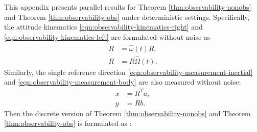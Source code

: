 This appendix presents parallel results for Theorem \ref{thm:observability-nonobs} and Theorem \ref{thm:observability-obs} under deterministic settings.
Specifically, the attitude kinematics \eqref{eqn:observability-kinematics-right} and \eqref{eqn:observability-kinematics-left} are formulated without noise as
\begin{align}
	\dot{R} &= \hat{\omega}(t) R, \label{eqn:observability-kinematics-right-deterministic} \\
	\dot{R} &= R\hat{\Omega}(t). \label{eqn:observability-kinematics-left-deterministic}
\end{align}
Similarly, the single reference direction \eqref{eqn:observability-measurement-inertial} and \eqref{eqn:observability-measurement-body} are also measured without noise:
\begin{align}
	x &= R^Ta, \label{eqn:observability-measurement-inertial-deterministic} \\
	y &= Rb. \label{eqn:observability-measurement-body-deterministic}
\end{align}
Then the discrete version of Theorem \ref{thm:observability-nonobs} and Theorem \ref{thm:observability-obs} is formulated as \cite{hermann1977nonlinear}:


